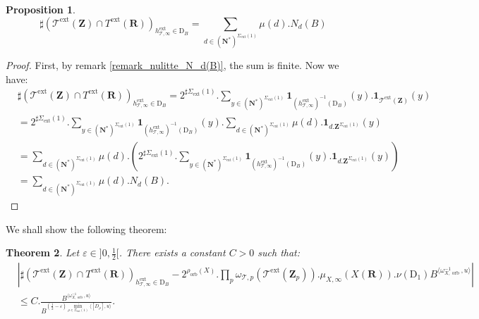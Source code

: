 \documentclass{proc-l}
\newcommand{\R}{\mathbf{R}}
\newcommand{\Z}{\mathbf{Z}}
\newcommand{\N}{\mathbf{N}}
\DeclareMathOperator{\orb}{orb}
\DeclareMathOperator{\ext}{ext}
\newcommand{\stackT}{\mathcal{T}}
\newcommand{\w}{\omega}
\newtheorem{theorem}{Theorem}[section]
\newtheorem{prop}[theorem]{Proposition}
\theoremstyle{definition}
\theoremstyle{remark}
\numberwithin{equation}{section}
\begin{document}
\begin{prop}
    $$ \sharp( \stackT^{\ext}(\Z) \cap T^{\ext}(\R) )_{h^{\ext}_{\stackT,\infty} \in \mathrm{D}_B} = \sum\limits_{d \in (\N^*)^{\Sigma_{\ext}(1)}} \mu(d) . N_d(B)  $$
\end{prop}

\begin{proof}
    First, by remark \ref{remark_nulitte_N_d(B)}, the sum is finite. Now we have:
    \begin{align*}
        &\sharp( \stackT^{\ext}(\Z) \cap T^{\ext}(\R) )_{h^{\ext}_{\stackT,\infty} \in \mathrm{D}_B} = 2^{\sharp \Sigma_{\ext}(1)}. \sum\limits_{y \in (\N^*)^{\Sigma_{\ext}(1)}} \mathbf{1}_{( h^{\ext}_{\stackT,\infty})^{-1}(\mathrm{D}_B)}(y) . \mathbf{1}_{\stackT^{\ext}(\Z)}(y) \\
        &= 2^{\sharp \Sigma_{\ext}(1)}. \sum\limits_{y \in (\N^*)^{\Sigma_{\ext}(1)}} \mathbf{1}_{(h^{\ext}_{\stackT,\infty})^{-1}(\mathrm{D}_B)}(y) . \sum\limits_{d \in (\N^*)^{\Sigma_{\ext}(1)}} \mu(d) . \mathbf{1}_{d.\Z^{\Sigma_{\ext}(1)}}(y) \\
        &= \sum\limits_{d \in (\N^*)^{\Sigma_{\ext}(1)}} \mu(d) . \left( 2^{\sharp \Sigma_{\ext}(1)}. \sum\limits_{y \in (\N^*)^{\Sigma_{\ext}(1)}} \mathbf{1}_{(h^{\ext}_{\stackT,\infty})^{-1}(\mathrm{D}_B)}(y) . \mathbf{1}_{d.\Z^{\Sigma_{\ext}(1)}}(y) \right) \\
        &= \sum\limits_{d \in (\N^*)^{\Sigma_{\ext}(1)}} \mu(d) . N_d(B) .
    \end{align*}
\end{proof}

We shall show the following theorem:

\begin{theorem}
Let $\varepsilon \in ]0,\frac{1}{2}[$. There exists a constant $C > 0$ such that:
\begin{align*}
    &\left| \sharp( \stackT^{\ext}(\Z) \cap T^{\ext}(\R) )_{h^{\ext}_{\stackT,\infty} \in \mathrm{D}_B} - 2^{\rho_{\orb}(X)} . \prod\limits_p \w_{\stackT,p}(\stackT^{\ext}(\Z_p)) . \mu_{X,\infty}(X(\R)). \nu(\mathrm{D}_1) B^{ \langle \w_{X,\orb}^{-1} , u \rangle } \right| \\
    &\leqslant C . \frac{B^{\langle \w_{X,\orb}^{-1} , u \rangle}}{B^{(\frac{1}{2} - \varepsilon) \min\limits_{\rho \in \Sigma_{\ext}(1)} \langle [D_{\rho}] , u \rangle }}.
\end{align*}
\end{theorem}
\end{document}

